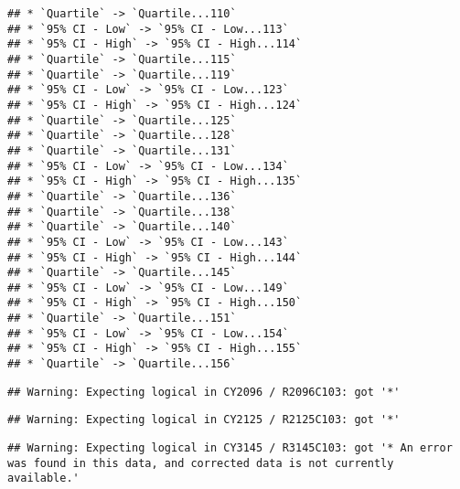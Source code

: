 \documentclass[
]{article}
\begin{document}
\begin{verbatim}
## * `Quartile` -> `Quartile...110`
## * `95% CI - Low` -> `95% CI - Low...113`
## * `95% CI - High` -> `95% CI - High...114`
## * `Quartile` -> `Quartile...115`
## * `Quartile` -> `Quartile...119`
## * `95% CI - Low` -> `95% CI - Low...123`
## * `95% CI - High` -> `95% CI - High...124`
## * `Quartile` -> `Quartile...125`
## * `Quartile` -> `Quartile...128`
## * `Quartile` -> `Quartile...131`
## * `95% CI - Low` -> `95% CI - Low...134`
## * `95% CI - High` -> `95% CI - High...135`
## * `Quartile` -> `Quartile...136`
## * `Quartile` -> `Quartile...138`
## * `Quartile` -> `Quartile...140`
## * `95% CI - Low` -> `95% CI - Low...143`
## * `95% CI - High` -> `95% CI - High...144`
## * `Quartile` -> `Quartile...145`
## * `95% CI - Low` -> `95% CI - Low...149`
## * `95% CI - High` -> `95% CI - High...150`
## * `Quartile` -> `Quartile...151`
## * `95% CI - Low` -> `95% CI - Low...154`
## * `95% CI - High` -> `95% CI - High...155`
## * `Quartile` -> `Quartile...156`
\end{verbatim}

\begin{verbatim}
## Warning: Expecting logical in CY2096 / R2096C103: got '*'
\end{verbatim}

\begin{verbatim}
## Warning: Expecting logical in CY2125 / R2125C103: got '*'
\end{verbatim}

\begin{verbatim}
## Warning: Expecting logical in CY3145 / R3145C103: got '* An error was found in this data, and corrected data is not currently available.'
\end{verbatim}
\end{document}

